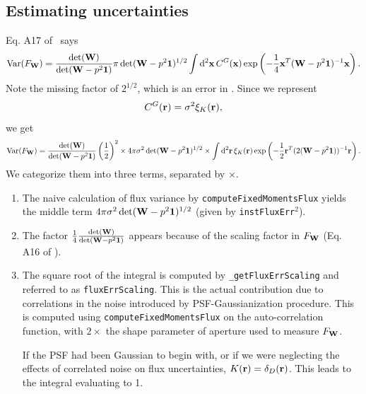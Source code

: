 \documentclass[DM,lsstdraft, authoryear,toc]{lsstdoc}
\newcommand{\rmd}{\mathrm{d}^2}
\begin{document}
\subsection{Estimating uncertainties}
Eq. A17 of~\cite{2015MNRAS.454.3500K} says
\begin{equation}
    \text{Var}(F_{\bf W}) = \frac{\det({\bf W})}{\det({\bf W}-p^2\bf{1})} \pi \det({\bf W}-p^2{\bf 1})^{1/2} \int\rmd {\bf x}\, C^G({\bf x}) \exp\left(-\frac{1}{4}{\bf x}^T({\bf W}-p^2{\bf 1})^{-1}{\bf x}\right).
    \label{eq:A17}
\end{equation}
Note the missing factor of $2^{1/2}$, which is an error in \cite{2015MNRAS.454.3500K}.
Since we represent
\begin{equation}
    C^G({\bf r}) = \sigma^2 \xi_{K}({\bf r}),
\end{equation}
we get
\begin{equation}
  \text{Var}(F_{\bf W}) = \frac{\det({\bf W})}{\det({\bf W}-p^2\bf{1})}\left(\frac{1}{2}\right)^2 \times 4\pi \sigma^2 \det({\bf W}-p^2{\bf 1})^{1/2} \times \int\rmd {\bf r}\, \xi_{K}({\bf r}) \exp\left(-\frac{1}{2}{\bf r}^T(2({\bf W}-p^2{\bf 1}))^{-1}{\bf r}\right).
\end{equation}
We categorize them into three terms, separated by $\times$.
\begin{enumerate}
  \item The naive calculation of flux variance by \texttt{computeFixedMomentsFlux} yields the middle term $4\pi \sigma^2 \det({\bf W}-p^2{\bf 1})^{1/2}$ (given by \texttt{instFluxErr}$^2$).
  \item The factor $\frac{1}{4}\frac{\det({\bf W})}{\det({\bf W}-p^2\bf{1})}$ appears because of the scaling factor in $F_{\bf W}$ (Eq. A16 of \cite{2015MNRAS.454.3500K}).
  \item The square root of the integral is computed by \texttt{\_getFluxErrScaling} and referred to as \texttt{fluxErrScaling}. This is the actual contribution due to correlations in the noise introduced by PSF-Gaussianization procedure. This is computed using \texttt{computeFixedMomentsFlux} on the auto-correlation function, with $2 \times$ the shape parameter of aperture used to measure $F_{\bf W}$.

  If the PSF had been Gaussian to begin with, or if we were neglecting the effects of correlated noise on flux uncertainties, $K({\bf r}) = \delta_D({\bf r})$. This leads to the integral evaluating to 1.
\end{enumerate}
\end{document}
